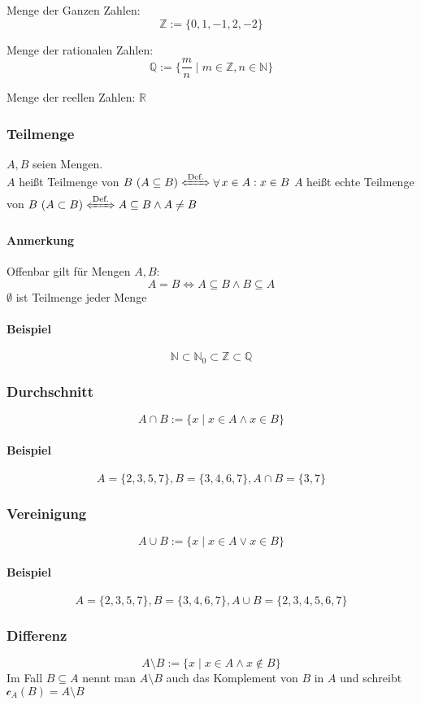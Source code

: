 \documentclass[a4paper]{scrartcl}
\DeclareMathOperator{\Forall}{\forall}
\theoremstyle{definition}
\theoremstyle{plain}
\theoremstyle{plain}
\theoremstyle{remark}
\theoremstyle{remark}
\theoremstyle{remark}
\theoremstyle{remark}
\theoremstyle{remark}
\begin{document}
Menge der Ganzen Zahlen:
\[\mathbb{Z} := \{0,1,-1,2,-2\}\]

Menge der rationalen Zahlen:
\[\mathbb{Q} := \{\frac{m}{n} \mid m\in\mathbb{Z}, n\in\mathbb{N}\}\]

Menge der reellen Zahlen: $\mathbb{R}$

\subsubsection{Teilmenge}
\label{sec-2-4-5}
$A,B$ seien Mengen. \\
    $A$ heißt Teilmenge von $B~(A\subseteq B) \xLeftrightarrow{\text{Def.}} \Forall x\in A: x\in B$
$A$ heißt echte Teilmenge von $B~(A\subset B) \xLeftrightarrow{\text{Def.}} A\subseteq B \wedge A\neq B$
\paragraph{Anmerkung}
\label{sec-2-4-5-1}
Offenbar gilt für Mengen $A,B$:
\[A=B \iff A\subseteq B \wedge B\subseteq A\]
$\emptyset$ ist Teilmenge jeder Menge

\paragraph{Beispiel}
\label{sec-2-4-5-2}
\[\mathbb{N}\subset\mathbb{N}_0\subset\mathbb{Z}\subset\mathbb{Q}\]

\subsubsection{Durchschnitt}
\label{sec-2-4-6}
\[A \cap B := \{x\mid x\in A \wedge x\in B\}\]
\paragraph{Beispiel}
\label{sec-2-4-6-1}
\[A=\{2,3,5,7\}, B=\{3,4,6,7\}, A\cap B = \{3,7\}\]

\subsubsection{Vereinigung}
\label{sec-2-4-7}
\[A\cup B := \{x\mid x\in A \vee x\in B\}\]
\paragraph{Beispiel}
\label{sec-2-4-7-1}
\[A=\{2,3,5,7\}, B=\{3,4,6,7\}, A\cup B = \{2,3,4,5,6,7\}\]

\subsubsection{Differenz}
\label{sec-2-4-8}
\[A\setminus B := \{x\mid x\in A \wedge x\not\in B\}\]
Im Fall $B\subseteq A$ nennt man $A\setminus B$ auch das Komplement von $B$ in $A$ und schreibt $\mathcal{c}_A(B) = A\setminus B$
\end{document}
